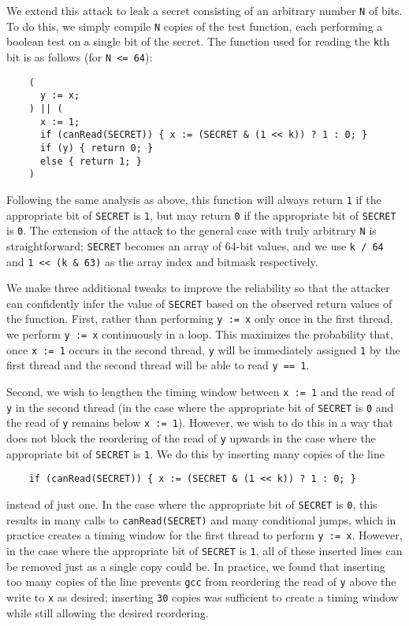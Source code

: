 We extend this attack to leak a secret consisting of an arbitrary number
\verb|N| of bits.
To do this, we simply compile \verb|N| copies of the test function, each
performing a boolean test on a single bit of the secret.
The function used for reading the \verb|k|th bit is as follows (for
\verb|N <= 64|):
\begin{verbatim}
    (
      y := x;
    ) || (
      x := 1;
      if (canRead(SECRET)) { x := (SECRET & (1 << k)) ? 1 : 0; }
      if (y) { return 0; }
      else { return 1; }
    )
\end{verbatim}
Following the same analysis as above, this function will always return \verb|1|
if the appropriate bit of \verb|SECRET| is \verb|1|, but may return \verb|0| if
the appropriate bit of \verb|SECRET| is \verb|0|.
The extension of the attack to the general case with truly arbitrary \verb|N|
is straightforward; \verb|SECRET| becomes an array of 64-bit values, and we use
\verb|k / 64| and \verb|1 << (k & 63)| as the array index and bitmask
respectively.

We make three additional tweaks to improve the reliability so that the attacker
can confidently infer the value of \verb|SECRET| based on the observed return
values of the function.
First, rather than performing \verb|y := x| only once in the first thread, we
perform \verb|y := x| continuously in a loop.
This maximizes the probability that, once \verb|x := 1| occurs in the second
thread, \verb|y| will be immediately assigned \verb|1| by the first thread
and the second thread will be able to read \verb|y == 1|.

Second, we wish to lengthen the timing window between \verb|x := 1| and the
read of \verb|y| in the second thread (in the case where the appropriate bit of
\verb|SECRET| is \verb|0| and the read of \verb|y| remains below
\verb|x := 1|).
However, we wish to do this in a way that does not block the reordering of the
read of \verb|y| upwards in the case where the appropriate bit of \verb|SECRET|
is \verb|1|.
We do this by inserting many copies of the line
\begin{verbatim}
    if (canRead(SECRET)) { x := (SECRET & (1 << k)) ? 1 : 0; }
\end{verbatim}
instead of just one.
In the case where the appropriate bit of \verb|SECRET| is \verb|0|, this
results in many calls to \verb|canRead(SECRET)| and many conditional jumps,
which in practice creates a timing window for the first thread to perform
\verb|y := x|.
However, in the case where the appropriate bit of \verb|SECRET| is \verb|1|,
all of these inserted lines can be removed just as a single copy could be.
In practice, we found that inserting too many copies of the line prevents
\verb|gcc| from reordering the read of \verb|y| above the write to \verb|x| as
desired; inserting \verb|30| copies was sufficient to create a timing window
while still allowing the desired reordering.


